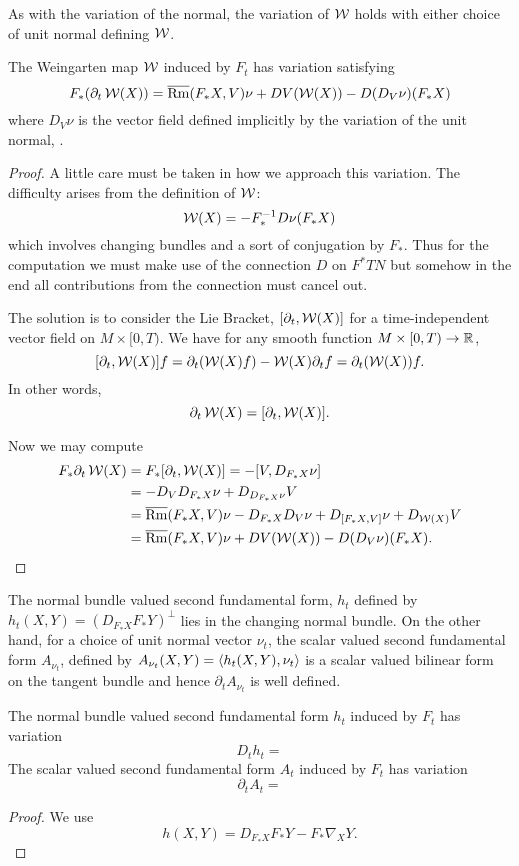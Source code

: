 As with the variation of the normal, the variation of \(\operatorname{\mathcal{W}}\) holds with either choice of unit normal defining \(\operatorname{\mathcal{W}}\).

\begin{lemma}
\label{lem:dt_W}
The Weingarten map \(\operatorname{\mathcal{W}}\) induced by \(F_t\) has variation satisfying
\[
F_{\ast} (\partial_t \operatorname{\mathcal{W}} (X)) = \overline{\operatorname{Rm}} (F_{\ast} X, V)\nu + DV (\operatorname{\mathcal{W}} (X)) - D(D_V \nu) ({F_{\ast} X})
\]
where \(D_V \nu\) is the vector field defined implicitly by the variation of the unit normal, .
\end{lemma}

\begin{proof}
A little care must be taken in how we approach this variation. The difficulty arises from the definition of \(\operatorname{\mathcal{W}}\):
\[
\operatorname{\mathcal{W}}(X) = -F_{\ast}^{-1} D\nu(F_{\ast} X)
\]
which involves changing bundles and a sort of conjugation by \(F_{\ast}\). Thus for the computation we must make use of the connection \(D\) on \(F^{\ast} TN\) but somehow in the end all contributions from the connection must cancel out.

The solution is to consider the Lie Bracket, \([\partial_t, \operatorname{\mathcal{W}}(X)]\) for a time-independent vector field on \(M \times [0, T)\). We have for any smooth function \(M \times [0, T) \to \mathbb{R}\),
\[
[\partial_t, \operatorname{\mathcal{W}}(X)] f = \partial_t (\operatorname{\mathcal{W}}(X) f) - \operatorname{\mathcal{W}}(X) \partial_t f = \partial_t (\operatorname{\mathcal{W}}(X)) f.
\]
In other words,
\[
\partial_t \operatorname{\mathcal{W}}(X) = [\partial_t, \operatorname{\mathcal{W}}(X)].
\]

Now we may compute
\[
\begin{split}
F_{\ast} \partial_t \operatorname{\mathcal{W}}(X) &= F_{\ast} [\partial_t, \operatorname{\mathcal{W}}(X)] = -[V, D_{F_{\ast} X} \nu] \\
&= -D_V D_{F_{\ast} X} \nu + D_{D_{F_{\ast} X} \nu} V \\
&= \overline{\operatorname{Rm}} (F_{\ast} X, V)\nu - D_{F_{\ast} X} D_V \nu + D_{[F_{\ast} X, V]} \nu + D_{\operatorname{\mathcal{W}}(X)} V \\
&= \overline{\operatorname{Rm}} (F_{\ast} X, V)\nu + DV (\operatorname{\mathcal{W}} (X)) - D(D_V \nu) ({F_{\ast} X}).
\end{split}
\]
\end{proof}

The normal bundle valued second fundamental form, \(h_t\) defined by \(h_t(X, Y) = (D_{F_{\ast} X} F_{\ast} Y)^{\perp}\) lies in the changing normal bundle. On the other hand, for a choice of unit normal vector \(\nu_t\), the scalar valued second fundamental form \(A_{\nu_t}\), defined by \(A_{\nu_t} (X, Y) = \left\langle h_t(X, Y),\nu_t \right\rangle\) is a scalar valued bilinear form on the tangent bundle and hence \(\partial_t A_{\nu_t}\) is well defined.

\begin{lemma}
The normal bundle valued second fundamental form \(h_t\) induced by \(F_t\) has variation
\[
D_t h_t =
\]
The scalar valued second fundamental form \(A_t\) induced by \(F_t\) has variation
\[
\partial_t A_t =
\]
\end{lemma}

\begin{proof}
We use
\[
h(X, Y) = D_{F_{\ast} X} F_{\ast} Y - F_{\ast} \nabla_X Y.
\]
\end{proof}
